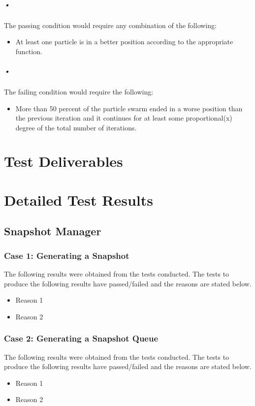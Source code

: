 \documentclass[11pt]{article}
\begin{document}
\subparagraph{•}
The passing condition would require any combination of the following:
\begin{itemize}
\item At least one particle is in a better position according to the appropriate function.
\end{itemize}

\subparagraph{•}
The failing condition would require the following: 
\begin{itemize}
\item More than 50 percent of the particle swarm ended in a worse position than the previous iteration and it continues for at least some proportional(x) degree of the total number of iterations.
\end{itemize}

\section{Test Deliverables}

\section{Detailed Test Results}
\subsection{Snapshot Manager}
\subsubsection{Case 1: Generating a Snapshot}
The following results were obtained from the tests conducted. The tests to produce the
following results have passed/failed and the reasons are stated below.

\begin{itemize}
	\item Reason 1
	\item Reason 2
\end{itemize}

\subsubsection{Case 2: Generating a Snapshot Queue}
The following results were obtained from the tests conducted. The tests to produce the
following results have passed/failed and the reasons are stated below.

\begin{itemize}
	\item Reason 1
	\item Reason 2
\end{itemize}
\end{document}
